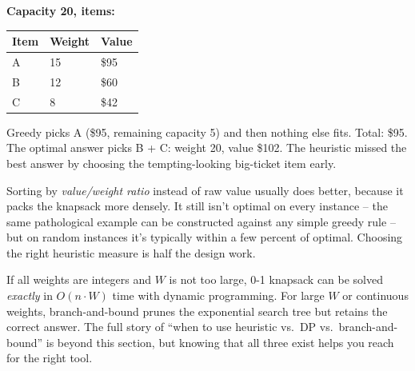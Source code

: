 \documentclass[11pt]{article}
\begin{document}
\begin{warnbox}
\textbf{Capacity 20, items:}
\begin{center}
\begin{tabular}{lll}
Item & Weight & Value \\
\hline
A & 15 & \$95 \\
B & 12 & \$60 \\
C & \phantom{0}8 & \$42 \\
\end{tabular}
\end{center}
Greedy picks A (\$95, remaining capacity 5) and then nothing else
fits. Total: \$95. The optimal answer picks B + C: weight 20, value
\$102. The heuristic missed the best answer by choosing the
tempting-looking big-ticket item early.
\end{warnbox}

\begin{ideabox}
Sorting by \emph{value/weight ratio} instead of raw value usually
does better, because it packs the knapsack more densely. It still
isn't optimal on every instance -- the same pathological example
can be constructed against any simple greedy rule -- but on random
instances it's typically within a few percent of optimal. Choosing
the right heuristic measure is half the design work.
\end{ideabox}

\begin{notebox}
If all weights are integers and $W$ is not too large, 0-1 knapsack
can be solved \emph{exactly} in $O(n \cdot W)$ time with dynamic
programming. For large $W$ or continuous weights, branch-and-bound
prunes the exponential search tree but retains the correct answer.
The full story of ``when to use heuristic vs.\ DP vs.\
branch-and-bound'' is beyond this section, but knowing that all
three exist helps you reach for the right tool.
\end{notebox}
\end{document}
